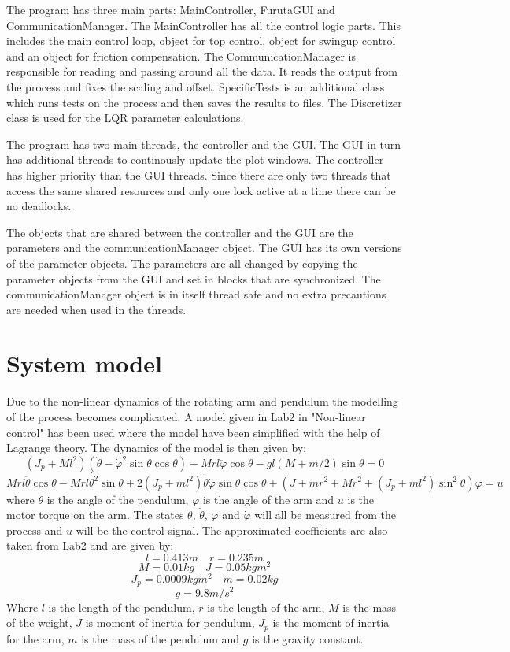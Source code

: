\documentclass[10pt,a4paper]{article}
\begin{document}

The program has three main parts: MainController, FurutaGUI and CommunicationManager. The MainController has all the control logic parts. This includes the main control loop, object for top control, object for swingup control and an object for friction compensation. The CommunicationManager is responsible for reading and passing around all the data. It reads the output from the process and fixes the scaling and offset. SpecificTests is an additional class which runs tests on the process and then saves the results to files. The Discretizer class is used for the LQR parameter calculations.

The program has two main threads, the controller and the GUI. The GUI in turn has additional threads to continously update the plot windows. The controller has higher priority than the GUI threads. Since there are only two threads that access the same shared resources and only one lock active at a time there can be no deadlocks.

The objects that are shared between the controller and the GUI are the parameters and the communicationManager object. The GUI has its own versions of the parameter objects. The parameters are all changed by copying the parameter objects from the GUI and set in blocks that are synchronized. The communicationManager object is in itself thread safe and no extra precautions are needed when used in the threads.


\section{System model}
Due to the non-linear dynamics of the rotating arm and pendulum the modelling of the process becomes complicated. A model given in Lab2 in "Non-linear control" has been used where the model have been simplified with the help of Lagrange theory. The dynamics of the model is then given by:
$$(J_p + Ml^2)(\ddot{\theta} - \dot{\varphi} ^2\sin\theta \cos\theta )+Mrl\ddot{\varphi}\cos\theta-gl(M+m/2)\sin\theta = 0 $$
\begin{equation}
Mrl\ddot{\theta}\cos\theta - Mrl\dot{\theta ^2}\sin\theta + 2(J_p + ml^2 ) \dot{\theta} \dot{\varphi}\sin\theta \cos\theta + (J+mr^2 + Mr^2 + (J_p+ml^2)\sin^2\theta)\ddot{\varphi}=u
\label{eq:model}
\end{equation}
where $\theta$ is the angle of the pendulum, $\varphi$ is the angle of the arm and $u$ is the motor torque on the arm. The states $\theta$, $\dot{\theta}$, $\varphi$ and $\dot{\varphi}$ will all be measured from the process and $u$ will be the control signal. The approximated coefficients are also taken from Lab2 and are given by:
$$l=0.413m \quad  r=0.235m$$
$$M=0.01kg \quad J=0.05kgm^2$$
$$J_p=0.0009kgm^2 \quad m=0.02kg$$
$$ g=9.8m/s^2$$
Where $l$ is the length of the pendulum, $r$ is the length of the arm, $M$ is the mass of the weight, $J$ is moment of inertia  for pendulum, $J_p$ is the moment of inertia for the arm, $m$ is the mass of the pendulum and $g$ is the gravity constant.
\end{document}
